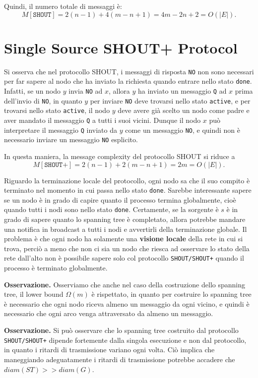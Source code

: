 Quindi, il numero totale di messaggi è:
\[\]
\[
    M[\texttt{SHOUT}] = 2(n - 1) + 4(m - n + 1) = 4m - 2n + 2 = O(|E|).
\]

\newpage
\section{Single Source SHOUT+ Protocol}

Si osserva che nel protocollo SHOUT, i messaggi di risposta \texttt{NO} non sono necessari per far sapere al nodo che ha inviato la richiesta quando entrare nello stato \texttt{done}. Infatti, se un nodo $y$ invia \texttt{NO} ad $x$, allora $y$ ha inviato un messaggio \texttt{Q} ad $x$ prima dell'invio di \texttt{NO}, in quanto $y$ per inviare \texttt{NO} deve trovarsi nello stato \texttt{active}, e per trovarsi nello stato \texttt{active}, il nodo $y$ deve avere già scelto un nodo come padre e aver mandato il messaggio \texttt{Q} a tutti i suoi vicini. Dunque il nodo $x$ può interpretare il messaggio \texttt{Q} inviato da $y$ come un messaggio \texttt{NO}, e quindi non è necessario inviare un messaggio \texttt{NO} esplicito. 

In questa maniera, la message complexity del protocollo SHOUT si riduce a 
\[
    M[\texttt{SHOUT+}] = 2(n - 1) + 2(m - n + 1) = 2m = O(|E|).
\]

Riguardo la terminazione locale del protocollo, ogni nodo sa che il suo compito è terminato nel momento in cui passa nello stato \texttt{done}. Sarebbe interessante sapere se un nodo è in grado di capire quanto il processo termina globalmente, cioè quando tutti i nodi sono nello stato \texttt{done}. Certamente, se la sorgente è $s$ è in grado di sapere quanto lo spanning tree è completato, allora potrebbe mandare una notifica in broadcast a tutti i nodi e avvertirli della terminazione globale. Il problema è che ogni nodo ha solamente una \textbf{visione locale} della rete in cui si trova, perciò a meno che non ci sia un nodo che riesca ad osservare lo stato della rete dall'alto non è possibile sapere solo col protocollo \texttt{SHOUT/SHOUT+} quando il processo è terminato globalmente.

\textbf{Osservazione.} Osserviamo che anche nel caso della costruzione dello spanning tree, il lower bound $\Omega(m)$ è rispettato, in quanto per costruire lo spanning tree è necessario che ogni nodo riceva almeno un messaggio da ogni vicino, e quindi è necessario che ogni arco venga attraversato da almeno un messaggio.

\textbf{Osservazione.} Si può osservare che lo spanning tree costruito dal protocollo \texttt{SHOUT/SHOUT+} dipende fortemente dalla singola esecuzione e non dal protocollo, in quanto i ritardi di trasmissione variano ogni volta. Ciò implica che maneggiando adeguatamente i ritardi di trasmissione potrebbe accadere che $diam(ST) >> diam(G)$.

